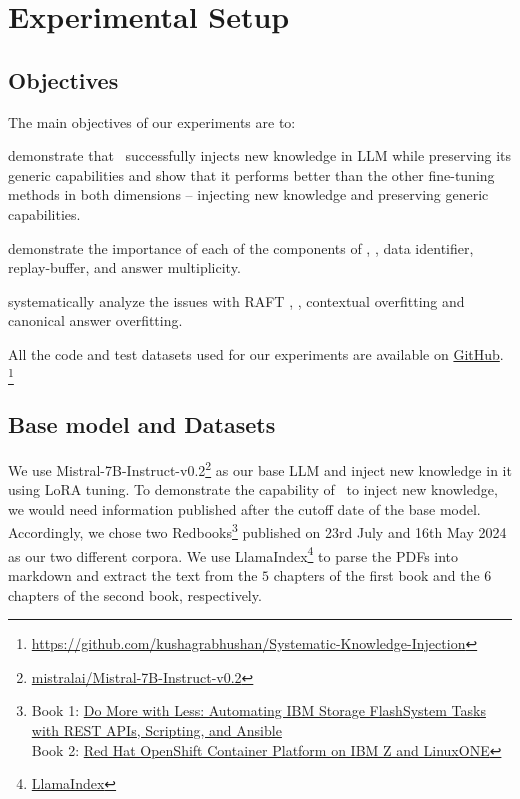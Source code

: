 \section{Experimental Setup}

\subsection{Objectives}
The main objectives of our experiments are to:
\begin{compactenum}[1)]
\item  demonstrate that \ourmethodshort\ successfully injects new knowledge in LLM while preserving its generic capabilities and show that it performs better than the other fine-tuning methods in both dimensions -- injecting new knowledge and preserving generic capabilities. 
\item demonstrate the importance of each of the components of \ourmethodshort, \viz, data identifier, replay-buffer, and answer multiplicity.
\item systematically analyze the issues with RAFT \citep{zhang2024raft}, \viz, contextual overfitting and canonical answer overfitting.
\end{compactenum}

All the code and test datasets used for our experiments are available on \href{https://github.com/kushagrabhushan/Systematic-Knowledge-Injection}{GitHub}. \footnote{\href{https://github.com/kushagrabhushan/Systematic-Knowledge-Injection}{https://github.com/kushagrabhushan/Systematic-Knowledge-Injection}} 

\subsection{Base model and Datasets}
\label{subsec:base_model_and_dataset}
We use Mistral-7B-Instruct-v0.2\footnote{\href{https://huggingface.co/mistralai/Mistral-7B-Instruct-v0.2}{mistralai/Mistral-7B-Instruct-v0.2}} as our base LLM and inject new knowledge in it using LoRA\cite{hu2022lora} tuning. 
To demonstrate the capability of \ourmethodshort\ to inject new knowledge, we would need information published after the cutoff date of the base model. Accordingly, we chose two Redbooks\footnote{Book 1: \href{https://www.redbooks.ibm.com/redpieces/pdfs/redp5736.pdf}{Do More with Less: Automating IBM Storage FlashSystem Tasks with REST APIs, Scripting, and Ansible}\\
Book 2: \href{https://www.redbooks.ibm.com/redpieces/pdfs/redp5711.pdf}{Red Hat OpenShift Container Platform on IBM Z and LinuxONE}
}
published on 23rd July and 16th May 2024 as our two different corpora. 
We use LlamaIndex\footnote{\href{https://www.llamaindex.ai/}{LlamaIndex}} to parse the PDFs into markdown and extract the text from the $5$ chapters of the first book and the $6$ chapters of the second book, respectively.


